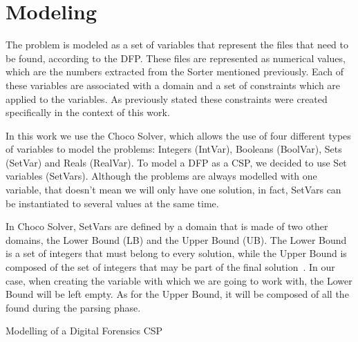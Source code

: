 \section{Modeling}

The problem is modeled as a set of variables that represent the files that need to be found, according to the \ac{DFP}. These files are represented as numerical values, which are the \INODE numbers extracted from the Sorter mentioned previously. Each of these variables are associated with a domain and a set of constraints which are applied to the variables. As previously stated these constraints were created specifically in the context of this work.

In this work we use the Choco Solver, which allows the use of four different types of variables to model the problems: Integers (IntVar), Booleans (BoolVar), Sets (SetVar) and Reals (RealVar). To model a \ac{DFP} as a \ac{CSP}, we decided to use Set variables (SetVars). Although the problems are always modelled with one variable, that doesn't mean we will only have one solution, in fact, SetVars can be instantiated to several values at the same time.

In Choco Solver, SetVars are defined by a domain that is made of two other domains, the Lower Bound (LB) and the Upper Bound (UB). The Lower Bound is a set of integers that must belong to every solution, while the Upper Bound is composed of the set of integers that may be part of the final solution~\cite{SetVar}. In our case, when creating the variable with which we are going to work with, the Lower Bound will be left empty. As for the  Upper Bound, it will be composed of all the \INODES found during the parsing phase.


\begin{algorithm}
    \caption{Modelling of a Digital Forensics \ac{CSP}}
    \label{modelling}
    \begin{algorithmic}
        \State{}
        \State{}
        \State{}
        \State{}
        \State{}
    \end{algorithmic}
\end{algorithm}

